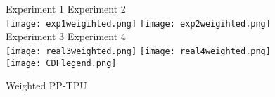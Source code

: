 \documentclass[10pt,journal,compsoc]{IEEEtran}
\begin{document}
\begin{figure}[!htb]
\centering
\hspace{0.3in} Experiment 1 \hspace{0.8in}  Experiment 2\\
\texttt{[image: exp1weigihted.png]}
\texttt{[image: exp2weigihted.png]}\\
\hspace{0.4in} Experiment 3 \hspace{0.8in}  Experiment 4\\
\texttt{[image: real3weighted.png]}
\texttt{[image: real4weighted.png]}\\
\vspace{3pt}
\texttt{[image: CDFlegend.png]}\vspace{-6pt}
\caption{Weighted PP-TPU} \label{fig:weight}
\end{figure} 
\end{document}
